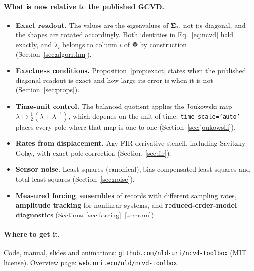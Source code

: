 \documentclass[report]{nld}
\theoremstyle{remark}\newtheorem*{remark}{Remark}
\newcommand{\Sg}{\symbf{\Sigma}}
\newcommand{\Ph}{\symbf{\Phi}}
\newcommand{\code}[1]{\texttt{#1}}
\begin{document}
\paragraph{What is new relative to the published GCVD.}
\begin{itemize}
  \item \textbf{Exact readout.} The values are the eigenvalues of $\Sg_2$, not
    its diagonal, and the shapes are rotated accordingly. Both identities in
    Eq.~\eqref{eq:ncvd} hold exactly, and $\lambda_i$ belongs to column $i$ of
    $\Ph$ by construction (Section~\ref{sec:algorithm}).
  \item \textbf{Exactness conditions.} Proposition~\ref{prop:exact} states when the
    published diagonal readout is exact and how large its error is when it is
    not (Section~\ref{sec:props}).
  \item \textbf{Time-unit control.} The balanced quotient applies the Joukowski map
    $\lambda\mapsto\tfrac12(\lambda+\lambda^{-1})$, which depends on the unit of
    time. \code{time\_scale='auto'} places every pole where that map is one-to-one
    (Section~\ref{sec:joukowski}).
  \item \textbf{Rates from displacement.} Any FIR derivative stencil, including
    Savitzky--Golay, with exact pole correction (Section~\ref{sec:fir}).
  \item \textbf{Sensor noise.} Least squares (canonical), bias-compensated least
    squares and total least squares (Section~\ref{sec:noise}).
  \item \textbf{Measured forcing}, \textbf{ensembles} of records with different
    sampling rates, \textbf{amplitude tracking} for nonlinear systems, and
    \textbf{reduced-order-model diagnostics} (Sections~\ref{sec:forcing}--\ref{sec:rom}).
\end{itemize}

\paragraph{Where to get it.} Code, manual, slides and animations:
\href{https://github.com/nld-uri/ncvd-toolbox}{\code{github.com/nld-uri/ncvd-toolbox}} (MIT license).
Overview page: \href{https://web.uri.edu/nld/ncvd-toolbox/}{\code{web.uri.edu/nld/ncvd-toolbox}}.
\end{document}
